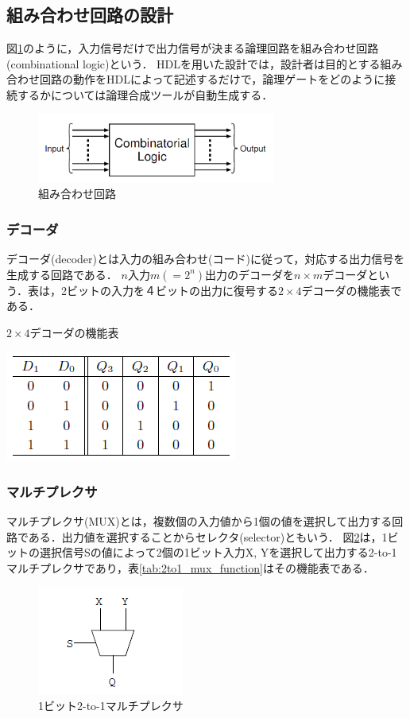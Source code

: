 \documentclass{jlreq}
\numberwithin{equation}{section}
\begin{document}
\subsection{組み合わせ回路の設計}
図\ref{fig:combinational_logic}のように，入力信号だけで出力信号が決まる論理回路を組み合わせ回路(combinational logic)という．
HDLを用いた設計では，設計者は目的とする組み合わせ回路の動作をHDLによって記述するだけで，論理ゲートをどのように接続するかについては論理合成ツールが自動生成する．
\begin{figure}[H]
	\centering
	\includegraphics[width=0.7\textwidth]{assets/combinational_logic.png}
	\caption{組み合わせ回路}
	\label{fig:combinational_logic}
\end{figure}

\subsubsection{デコーダ}
デコーダ(decoder)とは入力の組み合わせ(コード)に従って，対応する出力信号を生成する回路である．
$n\text{入力} m(=2^n)\text{出力}$のデコーダを$n \times m$デコーダという．表は，2ビットの入力を４ビットの出力に復号する$2\times4$デコーダの機能表である．
\begin{table}
	\centering
	\caption{$2\times4$デコーダの機能表}
	\includegraphics{assets/2x4_decoder_table.png}
	\label{tab:2x4_decoder_function}
\end{table}

\subsubsection{マルチプレクサ}
マルチプレクサ(MUX)とは，複数個の入力値から1個の値を選択して出力する回路である．出力値を選択することからセレクタ(selector)ともいう．
図\ref{fig:2to1_mux}は，1ビットの選択信号Sの値によって2個の1ビット入力X, Yを選択して出力する2-to-1マルチプレクサであり，表\ref{tab:2to1_mux_function}はその機能表である．
\begin{figure}[H]
	\centering
	\includegraphics{assets/2to1_mux.png}
	\caption{1ビット2-to-1マルチプレクサ}
	\label{fig:2to1_mux}
\end{figure}
\end{document}
